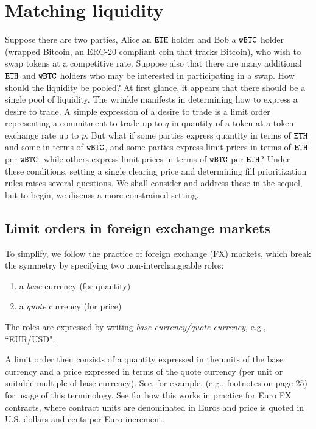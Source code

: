 \documentclass[11pt, reqno]{amsart}
\theoremstyle{definition}
\theoremstyle{remark}
\newcommand{\BTC}{\textnormal{\texttt{wBTC}}}
\newcommand{\ETH}{\textnormal{\texttt{ETH}}}
\begin{document}
\section{Matching liquidity}
Suppose there are two parties, Alice an $\ETH$ holder and Bob a $\BTC$ holder
(wrapped Bitcoin, an ERC-20 compliant coin that tracks Bitcoin), who wish to
swap tokens at a competitive rate. Suppose also that there are many
additional $\ETH$ and $\BTC$ holders who may be interested in participating in a
swap. How should the liquidity be pooled? At first glance, it appears that
there should be a single pool of liquidity. The wrinkle manifests in determining
how to express a desire to trade. A simple expression of a desire to trade is
a limit order representing a commitment to trade up to $q$ in quantity of
a token at a token exchange rate up to $p$. But what if some parties express
quantity in terms of $\ETH$ and some in terms of $\BTC$, and some parties
express limit prices in terms of $\ETH$ per $\BTC$, while others express limit
prices in terms of $\BTC$ per $\ETH$? Under these conditions, setting a single
clearing price and determining fill prioritization rules raises several
questions. We shall consider and address these in the sequel, but to begin, we
discuss a more constrained setting.

\subsection{Limit orders in foreign exchange markets}
To simplify, we follow the practice of foreign exchange (FX) markets,
which break the symmetry by specifying two non-interchangeable roles:
\begin{enumerate}
	\item a \emph{base} currency (for quantity)
	\item a \emph{quote} currency (for price)
\end{enumerate}
The roles are expressed by writing \emph{base currency/quote currency}, e.g.,
``EUR/USD".

A limit order then consists of a quantity expressed in the units of the base
currency and a price expressed in terms of the quote currency (per unit or
suitable multiple of base currency). See, for example, \cite{Cme23} (e.g.,
footnotes on page 25) for usage of this terminology. See \cite{CmeFx} for how
this works in practice for Euro FX contracts, where contract units are
denominated in Euros and price is quoted in U.S. dollars and cents per Euro
increment.
\end{document}

